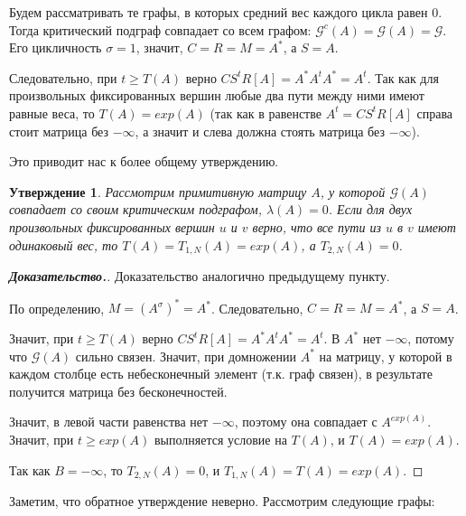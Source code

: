 \documentclass[12pt]{article}
\newtheorem{proposition}[theorem]{Утверждение}
\begin{document}
Будем рассматривать те графы, в которых средний вес каждого цикла равен $0$. Тогда критический подграф совпадает со всем графом: $\mathcal{G}^c(A) = \mathcal{G}(A) = \mathcal{G}$. Его цикличность $\sigma = 1$, значит, $C = R = M = A^*$, а $S = A$.

Следовательно, при $t \ge T(A)$ верно $CS^tR[A] = A^*A^tA^* = A^t$. Так как для произвольных фиксированных вершин любые два пути между ними имеют равные веса, то $T(A) = exp(A)$ (так как в равенстве $A^t = CS^tR[A]$ справа стоит матрица без $-\infty$, а значит и слева должна стоять матрица без $-\infty$).

Это приводит нас к более общему утверждению.

\begin{proposition} \label{onePathProposition}
Рассмотрим примитивную матрицу $A$, у которой $\mathcal{G}(A)$ совпадает со своим критическим подграфом, $\lambda(A) = 0$. Если для двух произвольных фиксированных вершин $u$ и $v$ верно, что все пути из $u$ в $v$ имеют одинаковый вес, то $T(A) = T_{1, N}(A) = exp(A)$, а $T_{2,N}(A) = 0$.
\end{proposition}
\begin{proof}[\textbf{Доказательство.}]
Доказательство аналогично предыдущему пункту.

По определению, $M = (A^\sigma)^* = A^*$. Следовательно, $C = R = M = A^*$, а $S = A$.

Значит, при $t \ge T(A)$ верно $CS^tR[A] = A^*A^tA^* = A^t$. В $A^*$ нет $-\infty$, потому что $\mathcal{G}(A)$ сильно связен. Значит, при домножении $A^*$ на матрицу, у которой в каждом столбце есть небесконечный элемент (т.к. граф связен), в результате получится матрица без бесконечностей.

Значит, в левой части равенства нет $-\infty$, поэтому она совпадает с $A^{exp(A)}$. Значит, при $t \ge exp(A)$ выполняется условие на $T(A)$, и $T(A) = exp(A)$.

Так как $B = -\infty$, то $T_{2, N}(A) = 0$, и $T_{1,N}(A) = T(A) = exp(A)$.
\end{proof}

Заметим, что обратное утверждение неверно. Рассмотрим следующие графы:
\end{document}
